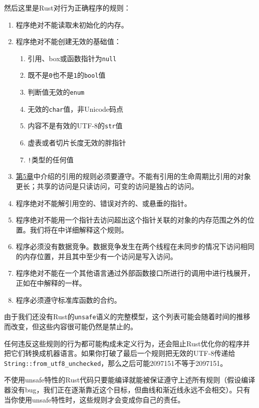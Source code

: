 然后这里是Rust对行为正确程序的规则：
\begin{enumerate}
    \item 程序绝对不能读取未初始化的内存。
    \item 程序绝对不能创建无效的基础值：
    \begin{enumerate}
        \item 引用、box或函数指针为\texttt{null}
        \item 既不是\texttt{0}也不是\texttt{1}的\texttt{bool}值
        \item 判断值无效的\texttt{enum}
        \item 无效的\texttt{char}值，非Unicode码点
        \item 内容不是有效的UTF-8的\texttt{str}值
        \item 虚表或者切片长度无效的胖指针
        \item \texttt{!}类型的任何值
    \end{enumerate}
    \item \hyperref[ch05]{第5章}中介绍的引用的规则必须要遵守。不能有引用的生命周期比引用的对象更长；共享的访问是只读访问，可变的访问是独占的访问。
    \item 程序绝对不能解引用空的、错误对齐的、或悬垂的指针。
    \item 程序绝对不能用一个指针去访问超出这个指针关联的对象的内存范围之外的位置。我们将在中详细解释这个规则。
    \item 程序必须没有数据竞争。数据竞争发生在两个线程在未同步的情况下访问相同的内存位置，并且其中至少有一个访问是写入访问。
    \item 程序绝对不能在一个其他语言通过外部函数接口所进行的调用中进行栈展开，正如在中解释的一样。
    \item 程序必须遵守标准库函数的合约。
\end{enumerate}

由于我们还没有Rust的\texttt{unsafe}语义的完整模型，这个列表可能会随着时间的推移而改变，但这些内容很可能仍然是禁止的。

任何违反这些规则的行为都可能构成未定义行为，还会阻止Rust优化你的程序并把它们转换成机器语言。如果你打破了最后一个规则把无效的UTF-8传递给\\
\texttt{String::from\_utf8\_unchecked}，那么之后可能2097151不等于2097151。

不使用unsafe特性的Rust代码只要能编译就能被保证遵守上述所有规则（假设编译器没有bug，我们正在逐渐靠近这个目标，但曲线和渐近线永远不会相交）。只有当你使用unsafe特性时，这些规则才会变成你自己的责任。

